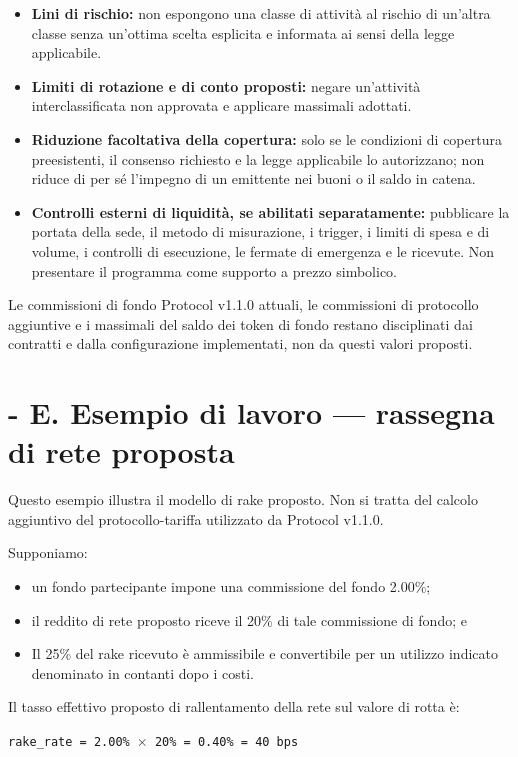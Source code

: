 \documentclass[11pt]{article}
\begin{document}
\begin{itemize}[leftmargin=*]
\item \textbf{Lini di rischio:} non espongono una classe di attività al rischio di un'altra classe senza un'ottima scelta esplicita e informata ai sensi della legge applicabile.
\item \textbf{Limiti di rotazione e di conto proposti:} negare un'attività interclassificata non approvata e applicare massimali adottati.
\item \textbf{Riduzione facoltativa della copertura:} solo se le condizioni di copertura preesistenti, il consenso richiesto e la legge applicabile lo autorizzano; non riduce di per sé l'impegno di un emittente nei buoni o il saldo in catena.
\item \textbf{Controlli esterni di liquidità, se abilitati separatamente:} pubblicare la portata della sede, il metodo di misurazione, i trigger, i limiti di spesa e di volume, i controlli di esecuzione, le fermate di emergenza e le ricevute. Non presentare il programma come supporto a prezzo simbolico.
\end{itemize}
Le commissioni di fondo Protocol v1.1.0 attuali, le commissioni di protocollo aggiuntive e i massimali del saldo dei token di fondo restano disciplinati dai contratti e dalla configurazione implementati, non da questi valori proposti.


\section*{- E. Esempio di lavoro --- rassegna di rete proposta}

Questo esempio illustra il modello di rake proposto. Non si tratta del calcolo aggiuntivo del protocollo-tariffa utilizzato da Protocol v1.1.0.

Supponiamo:

\begin{itemize}[leftmargin=*]
\item un fondo partecipante impone una commissione del fondo 2.00\%;
\item il reddito di rete proposto riceve il 20\% di tale commissione di fondo; e
\item Il 25\% del rake ricevuto è ammissibile e convertibile per un utilizzo indicato denominato in contanti dopo i costi.
\end{itemize}
Il tasso effettivo proposto di rallentamento della rete sul valore di rotta è:

\texttt{rake\_rate = 2.00\% $\times$ 20\% = 0.40\% = 40 bps}
\end{document}
